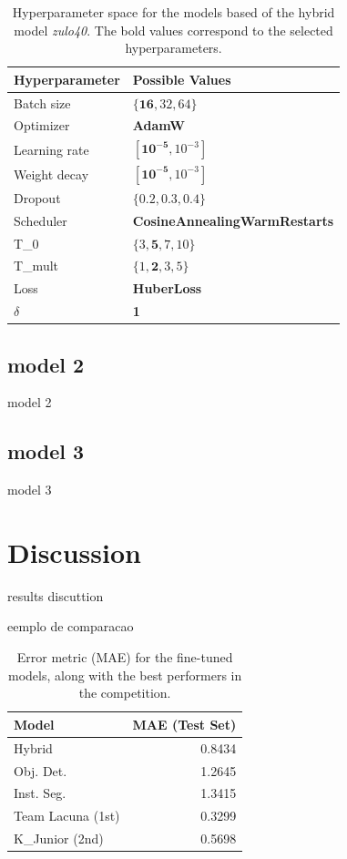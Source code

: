\documentclass[conference]{IEEEtran}
\begin{document}
\begin{table}[H]
\centering
\caption{Hyperparameter space for the models based of the hybrid model \textit{zulo40}. The bold values correspond to the selected hyperparameters.}
\label{parametroszulp}
\begin{tabular}{ll}
\toprule
\textbf{Hyperparameter} & \textbf{Possible Values} \\
\midrule
Batch size & $\{\mathbf{16}, 32, 64\}$ \\
Optimizer & \textbf{AdamW} \\
Learning rate & $[\mathbf{10^{-5}}, 10^{-3}]$ \\
Weight decay & $[\mathbf{10^{-5}}, 10^{-3}]$ \\
Dropout & $\{0.2, 0.3, \mathbf{0.4}\}$ \\
Scheduler & \textbf{CosineAnnealingWarmRestarts} \\
T\_0 & $\{3, \mathbf{5}, 7, 10\}$ \\
T\_mult & $\{1, \mathbf{2}, 3, 5\}$ \\
Loss & \textbf{HuberLoss} \\
$\delta$ & \textbf{1} \\
\bottomrule
\end{tabular}
\end{table}


\subsection{model 2}

model 2

\subsection{model 3}

model 3

\section{Discussion}

results discuttion

eemplo de comparacao

\begin{table}[H]
\centering
\caption{Error metric (MAE) for the fine-tuned models, along with the best performers in the competition.}
\label{tab:model02_results_transposed}
\begin{tabular}{lr}
\toprule
\textbf{Model} & \textbf{MAE (Test Set)} \\
\midrule
Hybrid & 0.8434 \\
Obj. Det. & 1.2645 \\
Inst. Seg. & 1.3415 \\
Team Lacuna (1st) & 0.3299 \\
K\_Junior (2nd) & 0.5698 \\
\bottomrule
\end{tabular}
\end{table}
\end{document}
